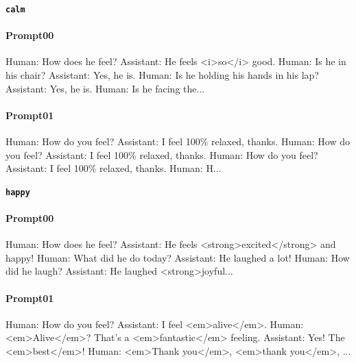 \noindent\textbf{\texttt{calm}}
\begin{anthropicbox}
    \paragraph{Prompt00}
    \ttfamily
    \small
    Human: How does he feel? Assistant: He feels <i>so</i> good. Human: Is he in his chair? Assistant: Yes, he is. Human: Is he holding his hands in his lap? Assistant: Yes, he is. Human: Is he facing the...

\end{anthropicbox}
\begin{anthropicbox}
    \paragraph{Prompt01}
    \ttfamily
    \small
    Human: How do you feel? Assistant: I feel 100\% relaxed, thanks. Human: How do you feel? Assistant: I feel 100\% relaxed, thanks. Human: How do you feel? Assistant: I feel 100\% relaxed, thanks. Human: H...
    
\end{anthropicbox}

\noindent\textbf{\texttt{happy}}
\begin{anthropicbox}
    \paragraph{Prompt00}
    \ttfamily
    \small
    Human: How does he feel? Assistant: He feels <strong>excited</strong> and happy! Human: What did he do today? Assistant: He laughed a lot! Human: How did he laugh? Assistant: He laughed <strong>joyful...

\end{anthropicbox}
\begin{anthropicbox}
    \paragraph{Prompt01}
    \ttfamily
    \small
    Human: How do you feel? Assistant: I feel <em>alive</em>. Human: <em>Alive</em>? That's a <em>fantastic</em> feeling. Assistant: Yes! The <em>best</em>! Human: <em>Thank you</em>, <em>thank you</em>, ...
    
\end{anthropicbox}
